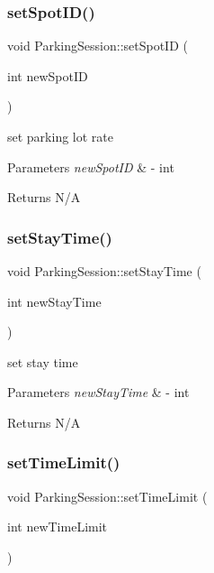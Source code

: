 \subsubsection{\texorpdfstring{set\+Spot\+I\+D()}{setSpotID()}}
{\footnotesize\ttfamily void Parking\+Session\+::set\+Spot\+ID (\begin{DoxyParamCaption}\item[{int}]{new\+Spot\+ID }\end{DoxyParamCaption})}



set parking lot rate 


\begin{DoxyParams}{Parameters}
{\em new\+Spot\+ID} & -\/ int \\
\hline
\end{DoxyParams}
\begin{DoxyReturn}{Returns}
N/A 
\end{DoxyReturn}
\mbox{\label{class_parking_session_a4b87ced554faf05185a8399b59e1db72}} 
\subsubsection{\texorpdfstring{set\+Stay\+Time()}{setStayTime()}}
{\footnotesize\ttfamily void Parking\+Session\+::set\+Stay\+Time (\begin{DoxyParamCaption}\item[{int}]{new\+Stay\+Time }\end{DoxyParamCaption})}



set stay time 


\begin{DoxyParams}{Parameters}
{\em new\+Stay\+Time} & -\/ int \\
\hline
\end{DoxyParams}
\begin{DoxyReturn}{Returns}
N/A 
\end{DoxyReturn}
\mbox{\label{class_parking_session_a7d3709e88ba42f4d3b0407f675a6bb78}} 
\subsubsection{\texorpdfstring{set\+Time\+Limit()}{setTimeLimit()}}
{\footnotesize\ttfamily void Parking\+Session\+::set\+Time\+Limit (\begin{DoxyParamCaption}\item[{int}]{new\+Time\+Limit }\end{DoxyParamCaption})}



